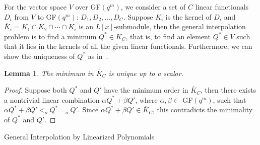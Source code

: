 \documentclass[11pt,onecolumn,draftcls]{IEEEtran}
\newtheorem{lemma}{Lemma}
\begin{document}
For the vector space $V$ over GF$(q^m)$, we consider a set of $C$ linear functionals $D_{i}$ from $V$ to GF$(q^m)$: $D_1, D_2, \ldots, D_{C}$. Suppose $K_i$ is the kernel of $D_i$ and $\overline{K}_{i} = K_{1} \cap K_{2} \cap \cdots \cap K_{i}$ is an $L[x]$-submodule, then the general interpolation problem is to find a minimum $Q^* \in \overline{K}_{C}$, that is, to find an element $Q^* \in V$ such that it lies in the kernels of all the given linear functionals. Furthermore, we can show the uniqueness of $Q^*$ as in~\cite{WangMcEliece05}.
\begin{lemma} \label{lemma: uniqueness}
The minimum in $\overline{K}_C$ is unique up to a scalar.
\end{lemma}
\begin{proof}
Suppose both $Q^*$ and $Q'$ have the minimum order in $\overline{K}_C$, then there exists a nontrivial linear combination $\alpha Q^* + \beta Q'$, where $\alpha, \beta \in $ GF$(q^m)$, such that $\alpha Q^* + \beta Q' <_o Q^* =_o Q'$. Since $\alpha Q^* + \beta Q' \in \overline{K}_C$, this contradicts the minimality of $Q^*$ and $Q'$.
\end{proof}

\begin{algorithm}
\caption{General Interpolation by Linearized Polynomials}
\label{alg: GILinearized}
\begin{algorithmic}
\ENDFOR
{}
\ENDFOR
{}
\ENDIF
\ENDFOR
\ENDIF
\ENDFOR
{}
\end{algorithmic}
\end{algorithm}
\end{document}
